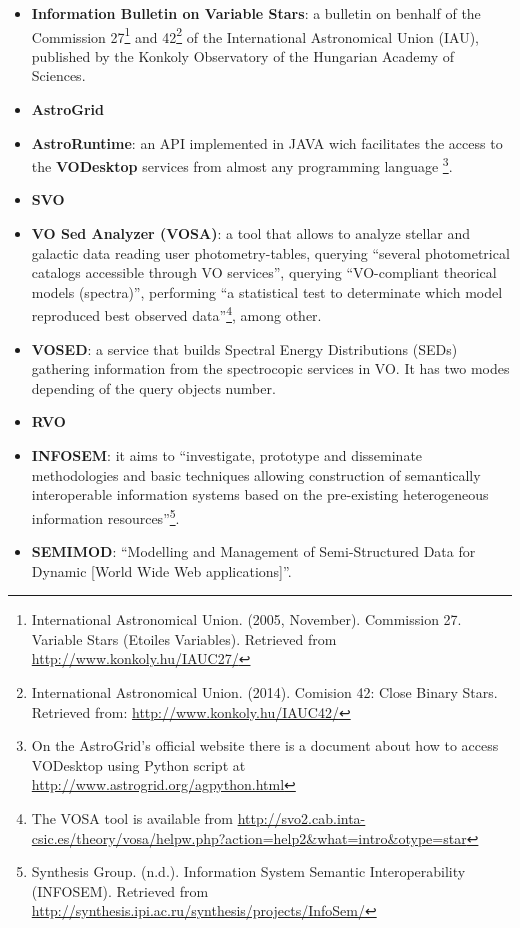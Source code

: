 \begin{itemize}
\item \textbf{Information Bulletin on Variable Stars}:
a bulletin on benhalf of the Commission 27\footnote{International Astronomical
Union. (2005, November). Commission 27. Variable Stars (Etoiles Variables).
Retrieved from \url{http://www.konkoly.hu/IAUC27/}} and
42\footnote{International Astronomical Union. (2014). Comision 42: Close Binary
Stars. Retrieved from: \url{http://www.konkoly.hu/IAUC42/}} of the International
Astronomical Union (IAU), published by the Konkoly Observatory of the Hungarian
Academy of Sciences. 

\item \textbf{AstroGrid}
\item \textbf{AstroRuntime}:
an API implemented in JAVA wich facilitates the access to the \textbf{VODesktop}
services from almost any programming language \footnote{On the AstroGrid's
official website there is a document about how to access VODesktop using Python
script at \url{http://www.astrogrid.org/agpython.html}}.

\item \textbf{SVO}
\item \textbf{VO Sed Analyzer (VOSA)}:
a tool that allows to analyze stellar and galactic data reading user
photometry-tables, querying ``several photometrical catalogs accessible through
VO services'', querying ``VO-compliant theorical models (spectra)'', performing
``a statistical test to determinate which model reproduced best observed
data''\footnote{The VOSA tool is available from
\url{http://svo2.cab.inta-csic.es/theory/vosa/helpw.php?action=help2&what=intro&otype=star}},
among other. 

\item \textbf{VOSED}:
a service that builds Spectral Energy Distributions (SEDs) gathering information
from the spectrocopic services in VO. It has two modes depending of the query
objects number.

\item \textbf{RVO}
\item \textbf{INFOSEM}:
it aims to ``investigate, prototype and disseminate methodologies and basic
techniques allowing construction of semantically interoperable information
systems based on the pre-existing heterogeneous information
resources''\footnote{Synthesis Group. (n.d.). Information System Semantic
Interoperability (INFOSEM). Retrieved from
\url{http://synthesis.ipi.ac.ru/synthesis/projects/InfoSem/}}.

\item \textbf{SEMIMOD}:
``Modelling and Management of Semi-Structured Data for Dynamic [World Wide Web
applications]''.


\end{itemize}
